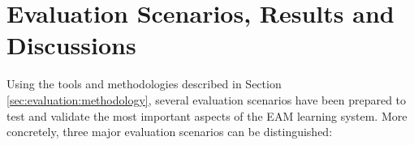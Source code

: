 \section{Evaluation Scenarios, Results and Discussions}
\label{sec:evaluation:scenarios}



Using the tools and methodologies described in Section \ref{sec:evaluation:methodology}, several evaluation scenarios have been prepared to test and validate the most important aspects of the EAM learning system. More concretely, three major evaluation scenarios can be distinguished:


